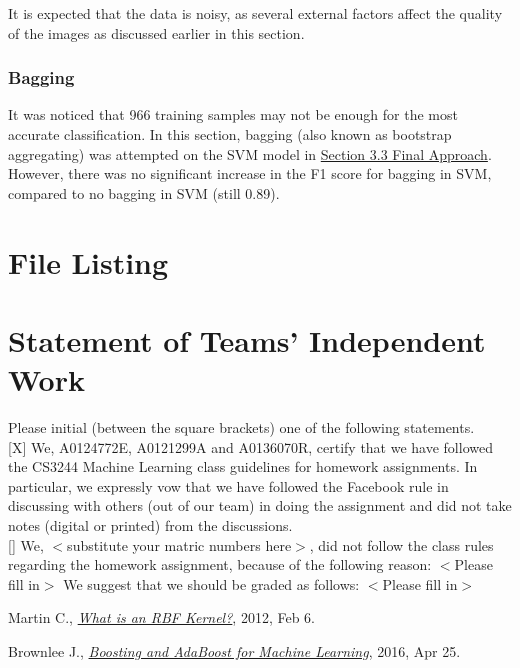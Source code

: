 \documentclass{article}
\begin{document}
It is expected that the data is noisy, as several external factors affect the quality of the images as discussed earlier in this section.

\subsubsection{Bagging}
It was noticed that 966 training samples may not be enough for the most accurate classification. In this section, bagging (also known as bootstrap aggregating) was attempted on the SVM model in \hyperref[sec:3.3]{Section 3.3 Final Approach}. \\

However, there was no significant increase in the F1 score for bagging in SVM, compared to no bagging in SVM (still 0.89).

\newpage

\section{File Listing}
\newpage

\section{Statement of Teams' Independent Work}
Please initial (between the square brackets) one of the following statements. \\

[X] We, A0124772E, A0121299A and A0136070R, certify that we have followed the CS3244 Machine Learning class guidelines for homework assignments. In particular, we expressly vow that we have followed the Facebook rule in discussing with others (out of our team) in doing the assignment and did not take notes (digital or printed) from the discussions. \\

[] We, $<$substitute your matric numbers here$>$, did not follow the class rules regarding the homework assignment, because of the following reason: $<$Please fill in$>$
We suggest that we should be graded as follows: $<$Please fill in$>$
\newpage

\begin{thebibliography}{20}
	Martin C.,
	\emph{\href{https://charlesmartin14.wordpress.com/2012/02/06/kernels_part_1/}{What is an RBF Kernel?}},
	2012, Feb 6.
	
	Brownlee J.,
	\emph{\href{http://machinelearningmastery.com/boosting-and-adaboost-for-machine-learning/}{Boosting and AdaBoost for Machine Learning}},
	2016, Apr 25.
\end{thebibliography}
\end{document}
